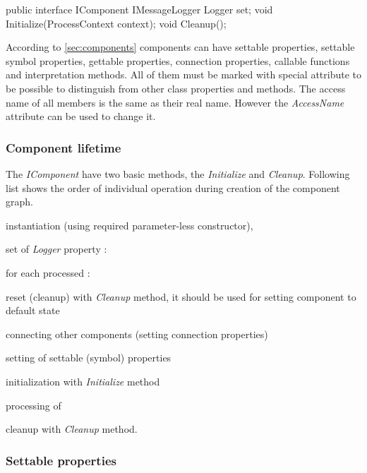 \begin{Csharp}[label=code:IComponent,caption={Interface of the \emph{ProcessManager} class}]
public interface IComponent {
	IMessageLogger Logger { set; }
	void Initialize(ProcessContext context);
	void Cleanup();
}
\end{Csharp}

According to \autoref{sec:components} components can have settable properties, settable symbol properties, gettable properties, connection properties, callable functions and interpretation methods.
All of them must be marked with special attribute to be possible to distinguish from other class properties and methods.
The access name of all members is the same as their real name.
However the \emph{AccessName} attribute can be used to change it.

\subsubsection{Component lifetime}
\label{sec:componentLifetime}

The \emph{IComponent} have two basic methods, the \emph{Initialize} and \emph{Cleanup}.
Following list shows the order of individual operation during creation of the component graph.

\begin{itemize*}
	\item instantiation (using required parameter-less constructor),
	\item set of \emph{Logger} property \lsystem:
	\item for each processed \lsystem:
	\begin{itemize*}
		\item reset (cleanup) with \emph{Cleanup} method, it should be used for setting component to default state
		\item connecting other components (setting connection properties)
		\item setting of settable (symbol) properties
		\item initialization with \emph{Initialize} method
		\item processing of \lsystem
	\end{itemize*}
	\item cleanup with \emph{Cleanup} method.
\end{itemize*}



\subsubsection{Settable properties}

